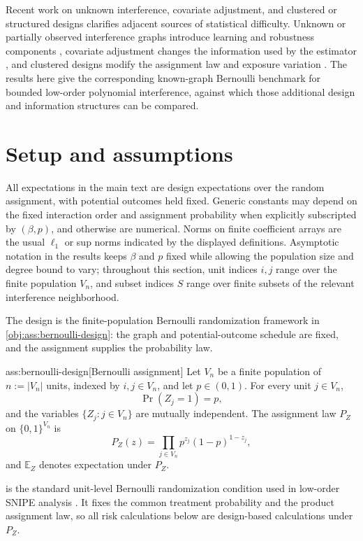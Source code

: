 \documentclass[11pt]{article}
\begin{document}
Recent work on unknown interference, covariate adjustment, and clustered or structured designs clarifies adjacent sources of statistical difficulty. Unknown or partially observed interference graphs introduce learning and robustness components \citep{YuAiroldiBorgsChayes2022,EichhornKhanUganderYu2026}, covariate adjustment changes the information used by the estimator \citep{Lin2013,WangLi2026}, and clustered designs modify the assignment law and exposure variation \citep{Basse2018a,Basse2018b,HarshawSavjeWang2025}. The results here give the corresponding known-graph Bernoulli benchmark for bounded low-order polynomial interference, against which those additional design and information structures can be compared.


\section{Setup and assumptions}

All expectations in the main text are design expectations over the random assignment, with potential outcomes held fixed. Generic constants may depend on the fixed interaction order and assignment probability when explicitly subscripted by \((\beta,p)\), and otherwise are numerical. Norms on finite coefficient arrays are the usual \(\ell_1\) or sup norms indicated by the displayed definitions. Asymptotic notation in the results keeps \(\beta\) and \(p\) fixed while allowing the population size and degree bound to vary; throughout this section, unit indices \(i,j\) range over the finite population \(V_n\), and subset indices \(S\) range over finite subsets of the relevant interference neighborhood.

The design is the finite-population Bernoulli randomization framework in \cref{obj:ass:bernoulli-design}: the graph and potential-outcome schedule are fixed, and the assignment supplies the probability law.

\begin{assumptionv}{ass:bernoulli-design}[Bernoulli assignment]
Let \(V_n\) be a finite population of \(n:=|V_n|\) units, indexed by \(i,j\in V_n\), and let \(p\in(0,1)\). For every unit \(j\in V_n\),
\[
\Pr(Z_j=1)=p,
\]
and the variables \(\{Z_j:j\in V_n\}\) are mutually independent. The assignment law \(P_Z\) on \(\{0,1\}^{V_n}\) is
\[
P_Z(z)
=
\prod_{j\in V_n} p^{z_j}(1-p)^{1-z_j},
\]
and \(\mathbb E_Z\) denotes expectation under \(P_Z\).
\end{assumptionv}

 is the standard unit-level Bernoulli randomization condition used in low-order SNIPE analysis \citep{CortezRodriguezEichhornYu2023}. It fixes the common treatment probability and the product assignment law, so all risk calculations below are design-based calculations under \(P_Z\).
\end{document}
